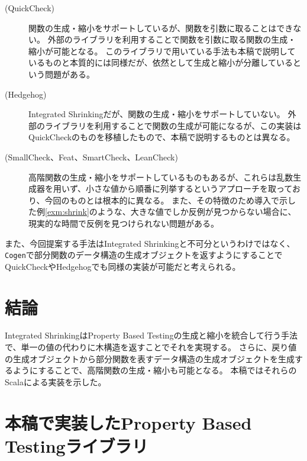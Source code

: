 \documentclass[submit,PRO,onecolumn]{ipsj}
\theoremstyle{definition}
\begin{document}
\begin{description}
  \item[(QuickCheck\cite{claessen_quickcheck_2011})]
    関数の生成・縮小をサポートしているが、関数を引数に取ることはできない。
    外部のライブラリ\cite{quickcheck-higherorder_online}を利用することで関数を引数に取る関数の生成・縮小が可能となる。
    このライブラリで用いている手法も本稿で説明しているものと本質的には同様だが、依然として生成と縮小が分離しているという問題がある。
  \item[(Hedgehog\cite{hedgehog_online})]
    Integrated Shrinkingだが、関数の生成・縮小をサポートしていない。
    外部のライブラリ\cite{hedgehog-fn_online}を利用することで関数の生成が可能になるが、この実装はQuickCheckのものを移植したもので、本稿で説明するものとは異なる。
  \item[(SmallCheck\cite{runciman_smallcheck_2008}、Feat\cite{duregaard_feat_2012}、SmartCheck\cite{pike_smartcheck_2014}、LeanCheck\cite{matela_braquehais_tools_2017})]
    高階関数の生成・縮小をサポートしているものもあるが、これらは乱数生成器を用いず、小さな値から順番に列挙するというアプローチを取っており、今回のものとは根本的に異なる。
    また、その特徴のため導入で示した例\ref{exm:shrink}のような、大きな値でしか反例が見つからない場合に、現実的な時間で反例を見つけられない問題がある。
\end{description}

また、今回提案する手法はIntegrated Shrinkingと不可分というわけではなく、\texttt{Cogen}で部分関数のデータ構造の生成オブジェクトを返すようにすることでQuickCheckやHedgehogでも同様の実装が可能だと考えられる。

\section{結論}

Integrated ShrinkingはProperty Based Testingの生成と縮小を統合して行う手法で、単一の値の代わりに木構造を返すことでそれを実現する。
さらに、戻り値の生成オブジェクトから部分関数を表すデータ構造の生成オブジェクトを生成するようにすることで、高階関数の生成・縮小も可能となる。
本稿ではそれらのScalaによる実装を示した。




\appendix

\section{本稿で実装したProperty Based Testingライブラリ}\label{sec:appndix-1}

\inputminted[breaklines]{scala}{../src/main/scala/minicheck.scala}
\end{document}
